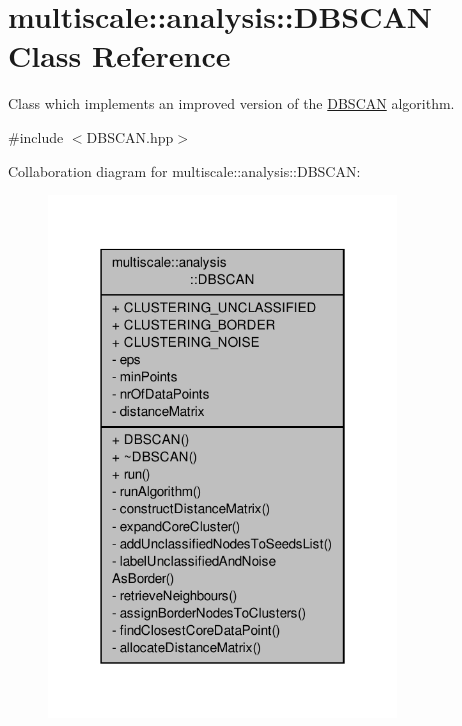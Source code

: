 \hypertarget{classmultiscale_1_1analysis_1_1DBSCAN}{\section{multiscale\-:\-:analysis\-:\-:D\-B\-S\-C\-A\-N Class Reference}
\label{classmultiscale_1_1analysis_1_1DBSCAN}
}


Class which implements an improved version of the \hyperlink{classmultiscale_1_1analysis_1_1DBSCAN}{D\-B\-S\-C\-A\-N} algorithm.  




{\ttfamily \#include $<$D\-B\-S\-C\-A\-N.\-hpp$>$}



Collaboration diagram for multiscale\-:\-:analysis\-:\-:D\-B\-S\-C\-A\-N\-:\nopagebreak
\begin{figure}[H]
\begin{center}
\leavevmode
\includegraphics[width=262pt]{classmultiscale_1_1analysis_1_1DBSCAN__coll__graph}
\end{center}
\end{figure}
